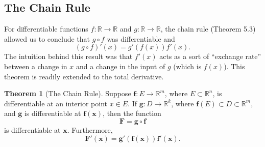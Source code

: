 \documentclass{article}
\newcommand{\R}{\mathbb{R}}
\newcommand{\x}{\mathbf{x}}
\newcommand{\f}{\mathbf{f}}
\theoremstyle{definition}
\newtheorem{theorem}{Theorem}[section]
\begin{document}
\subsection{The Chain Rule}
For differentiable functions $ f:\R\to\R $ and $ g:\R\to\R $, the chain rule (Theorem 5.3) allowed us to conclude that $ g\circ f $ was differentiable and $$ (g\circ f)'(x)=g'(f(x))f'(x).$$ The intuition behind this result was that $ f'(x) $ acts as a sort of ``exchange rate'' between a change in $ x $ and a change in the input of $ g $ (which is $ f(x) $). This theorem is readily extended to the total derivative.
\begin{theorem}[The Chain Rule]
	Suppose $ \f:E\to\R^m $, where $ E\subset \R^n $, is differentiable at an interior point $ x\in E $. If $ \mathbf g:D\to \R^k $, where $ \f(E)\subset D\subset \R^m $, and $ \mathbf g $ is differentiable at $ \f(\x) $, then the function $$\mathbf F=\mathbf g \circ \f $$ is differentiable at $ \x$. Furthermore, 
	$$ \mathbf F'(\x)= \mathbf g'(\f(\x))\f'(\x).$$
\end{theorem}
\end{document}

